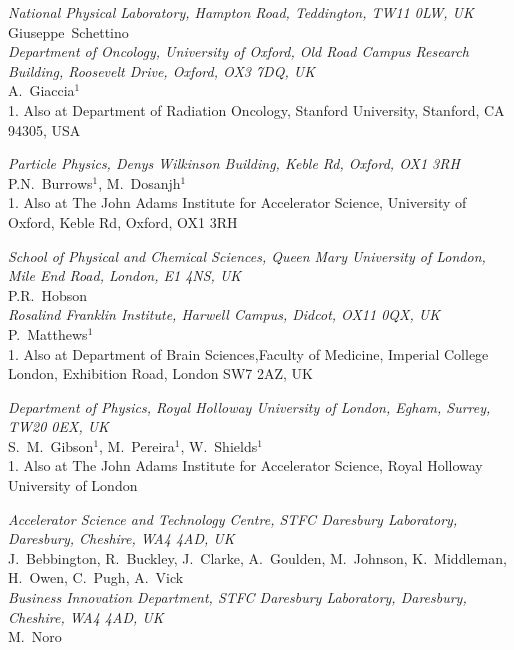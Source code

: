 \noindent \textit{National Physical Laboratory, Hampton Road, Teddington, TW11 0LW, UK} \\
Giuseppe~Schettino \\
 
\noindent \textit{Department of Oncology, University of Oxford, Old Road Campus Research Building, Roosevelt Drive, Oxford, OX3 7DQ, UK} \\
A.~Giaccia$^{1}$ \\
{\footnotesize
  1. Also at Department of Radiation Oncology, Stanford University, Stanford, CA 94305, USA \\
}
 
\noindent \textit{Particle Physics, Denys Wilkinson Building, Keble Rd, Oxford, OX1 3RH} \\
P.N.~Burrows$^{1}$, M.~Dosanjh$^{1}$ \\
{\footnotesize
  1. Also at The John Adams Institute for Accelerator Science, University of Oxford, Keble Rd, Oxford, OX1 3RH \\
}
 
\noindent \textit{School of Physical and Chemical Sciences, Queen Mary University of London, Mile End Road, London, E1 4NS, UK} \\
P.R.~Hobson \\
 
\noindent \textit{Rosalind Franklin Institute, Harwell Campus, Didcot, OX11 0QX, UK} \\
P.~Matthews$^{1}$ \\
{\footnotesize
  1. Also at Department of Brain Sciences,Faculty of Medicine, Imperial College London, Exhibition Road, London SW7 2AZ, UK \\
}
 
\noindent \textit{Department of Physics, Royal Holloway University of London, Egham, Surrey, TW20 0EX, UK} \\
S.~M.~Gibson$^{1}$, M.~Pereira$^{1}$, W.~Shields$^{1}$ \\
{\footnotesize
  1. Also at The John Adams Institute for Accelerator Science, Royal Holloway University of London \\
}
 
\noindent \textit{Accelerator Science and Technology Centre, STFC Daresbury Laboratory, Daresbury, Cheshire, WA4 4AD, UK} \\
J.~Bebbington, R.~Buckley, J.~Clarke, A.~Goulden, M.~Johnson, K.~Middleman, H.~Owen, C.~Pugh, A.~Vick \\
 
\noindent \textit{Business Innovation Department, STFC Daresbury Laboratory, Daresbury, Cheshire, WA4 4AD, UK} \\
M.~Noro \\
 
